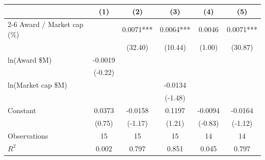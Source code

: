 \begin{tabular}{lccccc}
\toprule
& \multicolumn{1}{c}{(1)} & \multicolumn{1}{c}{(2)} & \multicolumn{1}{c}{(3)} & \multicolumn{1}{c}{(4)} & \multicolumn{1}{c}{(5)} \\
\cmidrule(lr){2-6}
Award / Market cap (\%) &  & 0.0071*** & 0.0064*** & 0.0046 & 0.0071*** \\
 &  & (32.40) & (10.44) & (1.00) & (30.87) \\[3pt]
ln(Award \$M) & -0.0019 &  &  &  &  \\
 & (-0.22) &  &  &  &  \\[3pt]
ln(Market cap \$M) &  &  & -0.0134 &  &  \\
 &  &  & (-1.48) &  &  \\[3pt]
Constant & 0.0373 & -0.0158 & 0.1197 & -0.0094 & -0.0164 \\
 & (0.75) & (-1.17) & (1.21) & (-0.83) & (-1.12) \\[3pt]
\midrule
Observations & 15 & 15 & 15 & 14 & 14 \\
$R^2$ & 0.002 & 0.797 & 0.851 & 0.045 & 0.797 \\
\bottomrule
\end{tabular}